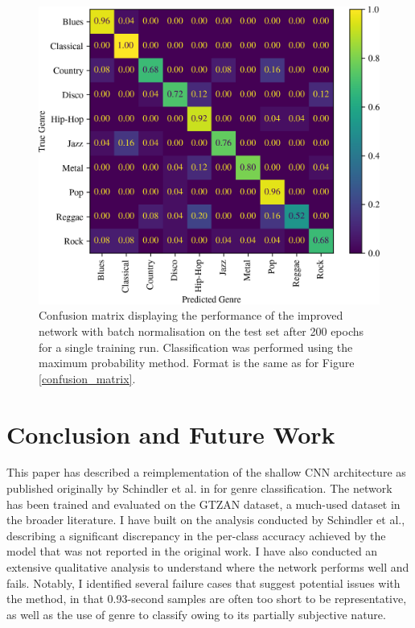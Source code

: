 \documentclass[conference]{IEEEtran}
\begin{document}
\begin{figure}[htbp]
    \centerline{\includegraphics[width=\columnwidth]{cm_improved.png}}
    \caption{
        Confusion matrix displaying the performance of the improved network with batch normalisation on the test set after 200 epochs for a single training run.
        Classification was performed using the maximum probability method.
        Format is the same as for Figure \ref{confusion_matrix}.
    }
    \label{confusion_matrix_improved}
\end{figure}

\section{Conclusion and Future Work}

This paper has described a reimplementation of the shallow CNN architecture as published originally by Schindler et al. in \cite{SchindlerLidyRauber} for genre classification.
The network has been trained and evaluated on the GTZAN \cite{TzanetakisCook} dataset, a much-used dataset in the broader literature.
I have built on the analysis conducted by Schindler et al., describing a significant discrepancy in the per-class accuracy achieved by the model that was not reported in the original work.
I have also conducted an extensive qualitative analysis to understand where the network performs well and fails.
Notably, I identified several failure cases that suggest potential issues with the method, in that 0.93-second samples are often too short to be representative, as well as the use of genre to classify owing to its partially subjective nature.
\end{document}
